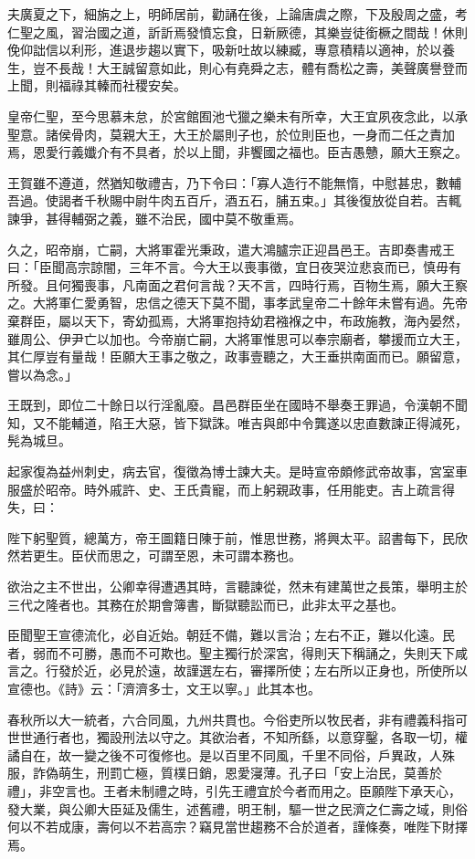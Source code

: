 \begin{pinyinscope}
夫廣夏之下，細旃之上，明師居前，勸誦在後，上論唐虞之際，下及殷周之盛，考仁聖之風，習治國之道，訢訢焉發憤忘食，日新厥德，其樂豈徒銜橛之間哉！休則俛仰詘信以利形，進退步趨以實下，吸新吐故以練臧，專意積精以適神，於以養生，豈不長哉！大王誠留意如此，則心有堯舜之志，體有喬松之壽，美聲廣譽登而上聞，則福祿其轃而社稷安矣。

皇帝仁聖，至今思慕未怠，於宮館囿池弋獵之樂未有所幸，大王宜夙夜念此，以承聖意。諸侯骨肉，莫親大王，大王於屬則子也，於位則臣也，一身而二任之責加焉，恩愛行義孅介有不具者，於以上聞，非饗國之福也。臣吉愚戇，願大王察之。

王賀雖不遵道，然猶知敬禮吉，乃下令曰：「寡人造行不能無惰，中慰甚忠，數輔吾過。使謁者千秋賜中尉牛肉五百斤，酒五石，脯五束。」其後復放從自若。吉輒諫爭，甚得輔弼之義，雖不治民，國中莫不敬重焉。

久之，昭帝崩，亡嗣，大將軍霍光秉政，遣大鴻臚宗正迎昌邑王。吉即奏書戒王曰：「臣聞高宗諒闇，三年不言。今大王以喪事徵，宜日夜哭泣悲哀而已，慎毋有所發。且何獨喪事，凡南面之君何言哉？天不言，四時行焉，百物生焉，願大王察之。大將軍仁愛勇智，忠信之德天下莫不聞，事孝武皇帝二十餘年未嘗有過。先帝棄群臣，屬以天下，寄幼孤焉，大將軍抱持幼君襁褓之中，布政施教，海內晏然，雖周公、伊尹亡以加也。今帝崩亡嗣，大將軍惟思可以奉宗廟者，攀援而立大王，其仁厚豈有量哉！臣願大王事之敬之，政事壹聽之，大王垂拱南面而已。願留意，嘗以為念。」

王既到，即位二十餘日以行淫亂廢。昌邑群臣坐在國時不舉奏王罪過，令漢朝不聞知，又不能輔道，陷王大惡，皆下獄誅。唯吉與郎中令龔遂以忠直數諫正得減死，髡為城旦。

起家復為益州刺史，病去官，復徵為博士諫大夫。是時宣帝頗修武帝故事，宮室車服盛於昭帝。時外戚許、史、王氏貴寵，而上躬親政事，任用能吏。吉上疏言得失，曰：

陛下躬聖質，總萬方，帝王圖籍日陳于前，惟思世務，將興太平。詔書每下，民欣然若更生。臣伏而思之，可謂至恩，未可謂本務也。

欲治之主不世出，公卿幸得遭遇其時，言聽諫從，然未有建萬世之長策，舉明主於三代之隆者也。其務在於期會簿書，斷獄聽訟而已，此非太平之基也。

臣聞聖王宣德流化，必自近始。朝廷不備，難以言治；左右不正，難以化遠。民者，弱而不可勝，愚而不可欺也。聖主獨行於深宮，得則天下稱誦之，失則天下咸言之。行發於近，必見於遠，故謹選左右，審擇所使；左右所以正身也，所使所以宣德也。《詩》云：「濟濟多士，文王以寧。」此其本也。

春秋所以大一統者，六合同風，九州共貫也。今俗吏所以牧民者，非有禮義科指可世世通行者也，獨設刑法以守之。其欲治者，不知所繇，以意穿鑿，各取一切，權譎自在，故一變之後不可復修也。是以百里不同風，千里不同俗，戶異政，人殊服，詐偽萌生，刑罰亡極，質樸日銷，恩愛寖薄。孔子曰「安上治民，莫善於禮」，非空言也。王者未制禮之時，引先王禮宜於今者而用之。臣願陛下承天心，發大業，與公卿大臣延及儒生，述舊禮，明王制，驅一世之民濟之仁壽之域，則俗何以不若成康，壽何以不若高宗？竊見當世趨務不合於道者，謹條奏，唯陛下財擇焉。


\end{pinyinscope}
